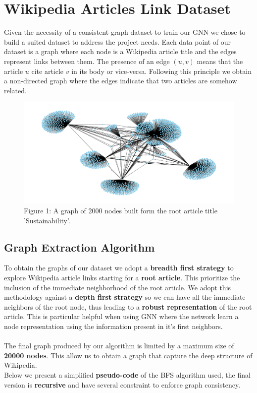\documentclass[11pt]{article}
\begin{document}
	\section{Wikipedia Articles Link Dataset}
	Given the necessity of a consistent graph dataset to train our GNN we chose to build a suited dataset to address the project needs.
	Each data point of our dataset is a graph where each node is a Wikipedia article title and the edges represent links between them. The presence of an edge $(u, v)$ means that the article $u$ cite article $v$ in its body or vice-versa.
	Following this principle we obtain a non-directed graph where the edges indicate that two articles are somehow related.
	\begin{figure}[h] %
		\centering
		\includegraphics[width=1\textwidth]{images/wiki_link_grap_2k.png}
		\caption{Figure 1: A graph of 2000 nodes built form the root article title 'Sustainability'.}
	\end{figure}
	
	\subsection{Graph Extraction Algorithm}
	To obtain the graphs of our dataset we adopt a \textbf{breadth first strategy} to explore Wikipedia article links starting for a \textbf{root article}. This prioritize the inclusion of the immediate neighborhood of the root article.
	We adopt this methodology against a \textbf{depth first strategy} so we can have all the immediate neighbors of the root node, thus leading to a \textbf{robust representation} of the root article.
	This is particular helpful when using GNN where the network learn a node representation using the information present in it's first neighbors.\\\\
	The final graph produced by our algorithm is limited by a maximum size of \textbf{20000 nodes}. This allow us to obtain a graph that capture the deep structure of Wikipedia. \\
	Below we present a simplified \textbf{pseudo-code} of the BFS algorithm used, the final version is \textbf{recursive} and have several constraint to enforce graph consistency. 
	
\end{document}

